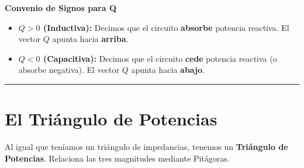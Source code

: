 \documentclass[
  a4paper,
  DIV=11,
  numbers=noendperiod]{scrreprt}
\providecommand{\tightlist}{%
  \setlength{\itemsep}{0pt}\setlength{\parskip}{0pt}}
\begin{document}
\begin{tcolorbox}[enhanced jigsaw, breakable, colback=white, left=2mm, leftrule=.75mm, rightrule=.15mm, toprule=.15mm, colframe=quarto-callout-warning-color-frame, arc=.35mm, bottomrule=.15mm, opacityback=0]

\vspace{-3mm}\textbf{Convenio de Signos para Q}\vspace{3mm}

\begin{itemize}
\tightlist
\item
  \textbf{\(Q > 0\) (Inductiva):} Decimos que el circuito
  \textbf{absorbe} potencia reactiva. El vector \(Q\) apunta hacia
  \textbf{arriba}.
\item
  \textbf{\(Q < 0\) (Capacitiva):} Decimos que el circuito \textbf{cede}
  potencia reactiva (o absorbe negativa). El vector \(Q\) apunta hacia
  \textbf{abajo}.
\end{itemize}

\end{tcolorbox}

\begin{center}\rule{0.5\linewidth}{0.5pt}\end{center}

\section{El Triángulo de Potencias}\label{el-triuxe1ngulo-de-potencias}

Al igual que teníamos un triángulo de impedancias, tenemos un
\textbf{Triángulo de Potencias}. Relaciona las tres magnitudes mediante
Pitágoras.
\end{document}
